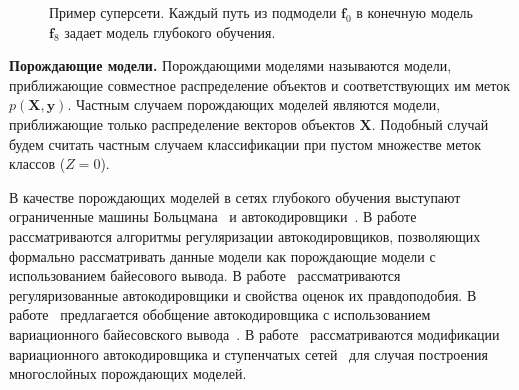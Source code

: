 \begin{figure}
\centering
{}
\caption{Пример суперсети. Каждый путь из подмодели $\mathbf{f}_0$ в конечную модель $\mathbf{f}_8$ задает модель глубокого обучения.}
\label{fig:supernet}

\end{figure}

\textbf{Порождающие модели. }
Порождающими моделями называются модели, приближающие совместное распределение объектов и соответствующих им меток $p(\mathbf{X}, \mathbf{y})$. Частным случаем порождающих моделей являются модели, приближающие только распределение векторов объектов $\mathbf{X}$. Подобный случай будем считать частным случаем классификации при пустом множестве меток классов ($Z=0$).

В качестве порождающих моделей в сетях глубокого обучения выступают ограниченные машины Больцмана~\cite{hinton_rbm} и автокодировщики~\cite{founds}. В работе~\cite{contractive} рассматриваются алгоритмы регуляризации автокодировщиков, позволяющих формально рассматривать данные модели как порождающие модели с использованием байесового вывода. В работе~\cite{score} рассматриваются регуляризованные автокодировщики и свойства оценок их правдоподобия. В работе~\cite{vae} предлагается обобщение автокодировщика с использованием вариационного байесовского вывода~\cite{Bishop}. В работе~\cite{train_generative} рассматриваются модификации вариационного автокодировщика и ступенчатых сетей~\cite{ladder} для случая построения многослойных порождающих моделей. 



